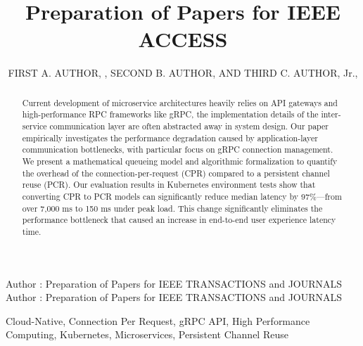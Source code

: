 \documentclass{ieeeaccess}
\begin{document}

\title{Preparation of Papers for IEEE ACCESS}
\author{\uppercase{First A. Author}, ,
\uppercase{Second B. Author}, AND \uppercase{Third C. Author},
Jr.,
}

\address[1]{National Institute of Standards and
Technology, Boulder, CO 80305 USA (e-mail: author@boulder.nist.gov)}
\address[2]{Department of Physics, Colorado State University, Fort Collins,
CO 80523 USA (e-mail: author@lamar.colostate.edu)}
\address[3]{Electrical Engineering Department, University of Colorado, Boulder, CO
80309 USA}

\markboth
{Author \headeretal: Preparation of Papers for IEEE TRANSACTIONS and JOURNALS}
{Author \headeretal: Preparation of Papers for IEEE TRANSACTIONS and JOURNALS}



\begin{abstract}
Current development of microservice architectures heavily relies on API gateways and high-performance RPC frameworks like gRPC, the implementation details of the inter-service communication layer are often abstracted away in system design. Our paper empirically investigates the performance degradation caused by application-layer communication bottlenecks, with particular focus on gRPC connection management. We present a mathematical queueing model and algorithmic formalization to quantify the overhead of the connection-per-request (CPR) compared to a persistent channel reuse (PCR). Our evaluation results in Kubernetes environment tests show that converting CPR to PCR models can significantly reduce median latency by 97\%—from over 7,000 ms to 150 ms under peak load. This change significantly eliminates the performance bottleneck that caused an increase in end-to-end user experience latency time.
\end{abstract}

\begin{keywords}
Cloud-Native, Connection Per Request, gRPC API, High Performance Computing, Kubernetes, Microservices, Persistent Channel Reuse 
\end{keywords}
\end{document}
